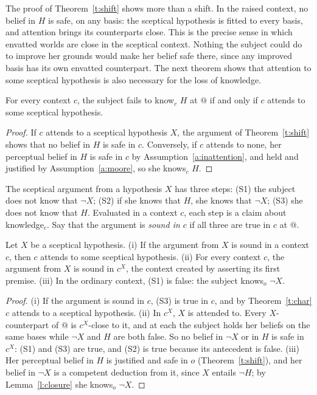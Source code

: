 \documentclass{situationist-preprint}
\begin{document}
The proof of Theorem~\ref{t:shift} shows more than a shift. In the raised context, no belief in $H$ is safe, on any basis: the sceptical hypothesis is fitted to every basis, and attention brings its counterparts close. This is the precise sense in which envatted worlds are close in the sceptical context. Nothing the subject could do to improve her grounds would make her belief safe there, since any improved basis has its own envatted counterpart. The next theorem shows that attention to some sceptical hypothesis is also necessary for the loss of knowledge.

\begin{theorem}[Characterization]\label{t:char}
For every context $c$, the subject fails to know$_c$ $H$ at $@$ if and only if $c$ attends to some sceptical hypothesis.
\end{theorem}

\begin{proof}
If $c$ attends to a sceptical hypothesis $X$, the argument of Theorem~\ref{t:shift} shows that no belief in $H$ is safe in $c$. Conversely, if $c$ attends to none, her perceptual belief in $H$ is safe in $c$ by Assumption~\ref{a:inattention}, and held and justified by Assumption~\ref{a:moore}, so she knows$_c$ $H$.
\end{proof}

The sceptical argument from a hypothesis $X$ has three steps: (S1) the subject does not know that $\neg X$; (S2) if she knows that $H$, she knows that $\neg X$; (S3) she does not know that $H$. Evaluated in a context $c$, each step is a claim about knowledge$_c$. Say that the argument is \emph{sound in $c$} if all three are true in $c$ at $@$.

\begin{corollary}\label{c:self}
Let $X$ be a sceptical hypothesis. (i) If the argument from $X$ is sound in a context $c$, then $c$ attends to some sceptical hypothesis. (ii) For every context $c$, the argument from $X$ is sound in $c^X$, the context created by asserting its first premise. (iii) In the ordinary context, (S1) is false: the subject knows$_o$ $\neg X$.
\end{corollary}

\begin{proof}
(i) If the argument is sound in $c$, (S3) is true in $c$, and by Theorem~\ref{t:char} $c$ attends to a sceptical hypothesis. (ii) In $c^X$, $X$ is attended to. Every $X$-counterpart of $@$ is $c^X$-close to it, and at each the subject holds her beliefs on the same bases while $\neg X$ and $H$ are both false. So no belief in $\neg X$ or in $H$ is safe in $c^X$: (S1) and (S3) are true, and (S2) is true because its antecedent is false. (iii) Her perceptual belief in $H$ is justified and safe in $o$ (Theorem~\ref{t:shift}), and her belief in $\neg X$ is a competent deduction from it, since $X$ entails $\neg H$; by Lemma~\ref{l:closure} she knows$_o$ $\neg X$.
\end{proof}
\end{document}
